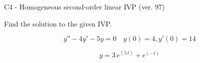 \begin{exercise}
  \begin{exerciseTitle}C4 - Homogeneous second-order linear IVP (ver. 97)\end{exerciseTitle}
  \begin{exerciseStatement}
    
Find the solution to the given IVP.

    
\[y''-4y'-5y = 0 \hspace{1em} y(0) = 4 , y'(0) = 14\]

  \end{exerciseStatement}
  \begin{exerciseAnswer}
    
\[y= 3 \, e^{\left(5 \, t\right)} + e^{\left(-t\right)}\]

  \end{exerciseAnswer}
\end{exercise}